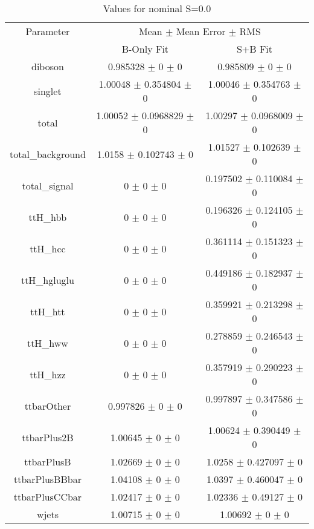 \begin{table}
\centering
\caption{Values for nominal S=0.0}
\begin{tabular}{ccc}
\toprule
Parameter & \multicolumn{2}{c}{Mean $\pm$ Mean Error $\pm$ RMS}\\
 & B-Only Fit & S+B Fit\\
\midrule
diboson & \num{0.985328} $\pm$ \num{0} $\pm$ \num{0} & \num{0.985809} $\pm$ \num{0} $\pm$ \num{0}\\
singlet & \num{1.00048} $\pm$ \num{0.354804} $\pm$ \num{0} & \num{1.00046} $\pm$ \num{0.354763} $\pm$ \num{0}\\
total & \num{1.00052} $\pm$ \num{0.0968829} $\pm$ \num{0} & \num{1.00297} $\pm$ \num{0.0968009} $\pm$ \num{0}\\
total\_background & \num{1.0158} $\pm$ \num{0.102743} $\pm$ \num{0} & \num{1.01527} $\pm$ \num{0.102639} $\pm$ \num{0}\\
total\_signal & \num{0} $\pm$ \num{0} $\pm$ \num{0} & \num{0.197502} $\pm$ \num{0.110084} $\pm$ \num{0}\\
ttH\_hbb & \num{0} $\pm$ \num{0} $\pm$ \num{0} & \num{0.196326} $\pm$ \num{0.124105} $\pm$ \num{0}\\
ttH\_hcc & \num{0} $\pm$ \num{0} $\pm$ \num{0} & \num{0.361114} $\pm$ \num{0.151323} $\pm$ \num{0}\\
ttH\_hgluglu & \num{0} $\pm$ \num{0} $\pm$ \num{0} & \num{0.449186} $\pm$ \num{0.182937} $\pm$ \num{0}\\
ttH\_htt & \num{0} $\pm$ \num{0} $\pm$ \num{0} & \num{0.359921} $\pm$ \num{0.213298} $\pm$ \num{0}\\
ttH\_hww & \num{0} $\pm$ \num{0} $\pm$ \num{0} & \num{0.278859} $\pm$ \num{0.246543} $\pm$ \num{0}\\
ttH\_hzz & \num{0} $\pm$ \num{0} $\pm$ \num{0} & \num{0.357919} $\pm$ \num{0.290223} $\pm$ \num{0}\\
ttbarOther & \num{0.997826} $\pm$ \num{0} $\pm$ \num{0} & \num{0.997897} $\pm$ \num{0.347586} $\pm$ \num{0}\\
ttbarPlus2B & \num{1.00645} $\pm$ \num{0} $\pm$ \num{0} & \num{1.00624} $\pm$ \num{0.390449} $\pm$ \num{0}\\
ttbarPlusB & \num{1.02669} $\pm$ \num{0} $\pm$ \num{0} & \num{1.0258} $\pm$ \num{0.427097} $\pm$ \num{0}\\
ttbarPlusBBbar & \num{1.04108} $\pm$ \num{0} $\pm$ \num{0} & \num{1.0397} $\pm$ \num{0.460047} $\pm$ \num{0}\\
ttbarPlusCCbar & \num{1.02417} $\pm$ \num{0} $\pm$ \num{0} & \num{1.02336} $\pm$ \num{0.49127} $\pm$ \num{0}\\
wjets & \num{1.00715} $\pm$ \num{0} $\pm$ \num{0} & \num{1.00692} $\pm$ \num{0} $\pm$ \num{0}\\
\bottomrule
\end{tabular}
\end{table}